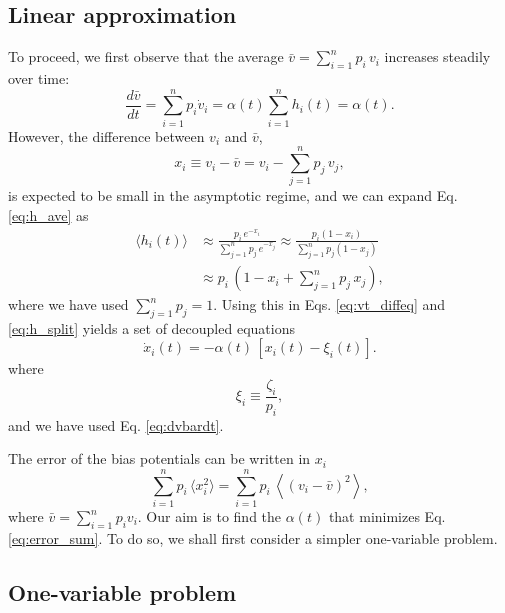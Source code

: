 \documentclass[reprint]{revtex4-1}
\begin{document}
\subsection{Linear approximation}



To proceed, we first observe that
the average $\bar v = \sum_{i = 1}^n p_i \, v_i$
increases steadily over time:
%
\begin{equation}
\frac{ d \bar v } { d t }
=
\sum_{i = 1}^n p_i \dot v_i
=
\alpha(t) \sum_{i = 1}^n h_i(t) = \alpha(t).
\label{eq:dvbardt}
\end{equation}
%
However, the difference between $v_i$ and $\bar v$,
%
\begin{equation}
  x_i \equiv v_i - \bar v = v_i - \sum_{j = 1}^n p_j \, v_j,
  \label{eq:x_def}
\end{equation}
%
is expected to be small in the asymptotic regime,
and we can expand Eq. \eqref{eq:h_ave} as
$$
\begin{aligned}
\langle h_i(t) \rangle
&\approx
\frac{ p_i \, e^{- x_i} }
{ \sum_{ j = 1}^n p_j \, e^{- x_j} }
\approx
\frac{ p_i ( 1 - x_i ) }
{ \sum_{ j = 1}^n p_j (1 - x_j) }
\\
&\approx
p_i \, \left(
  1 - x_i + \sum_{j=1}^n p_j \, x_j
\right),
\end{aligned}
$$
where we have used $\sum_{j=1}^n p_j = 1$.
%
Using this in Eqs. \eqref{eq:vt_diffeq}
and \eqref{eq:h_split} yields
a set of decoupled equations
%
\begin{equation}
  \dot x_i(t)
  =
  -\alpha(t) \, \left[ x_i(t) - \xi_i(t) \right].
  \label{eq:dxdt_WL}
\end{equation}
%
where
%
\begin{equation}
  \xi_i \equiv \frac{ \zeta_i } { p_i },
  \label{eq:xi_def}
\end{equation}
and we have used Eq. \eqref{eq:dvbardt}.

The error of the bias potentials can be written in $x_i$
\begin{equation}
\sum_{i = 1}^n p_i \, \langle x_i^2 \rangle
=
\sum_{i = 1}^n p_i \, \left\langle (v_i - \bar v)^2 \right\rangle,
\label{eq:error_sum}
\end{equation}
where
$\bar v = \sum_{i = 1}^n p_i v_i$.
%
Our aim is to find the $\alpha(t)$
that minimizes Eq. \eqref{eq:error_sum}.
%
To do so, we shall first consider
a simpler one-variable problem.



\subsection{One-variable problem}
\end{document}
